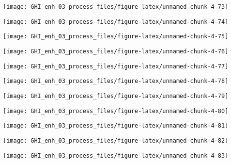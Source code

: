 \documentclass[
  10pt,
  a4paper,oneside]{article}
\begin{document}
\begin{center}\texttt{[image: GHI\_enh\_03\_process\_files/figure-latex/unnamed-chunk-4-73]} \end{center}

\begin{center}\texttt{[image: GHI\_enh\_03\_process\_files/figure-latex/unnamed-chunk-4-74]} \end{center}

\begin{center}\texttt{[image: GHI\_enh\_03\_process\_files/figure-latex/unnamed-chunk-4-75]} \end{center}

\begin{center}\texttt{[image: GHI\_enh\_03\_process\_files/figure-latex/unnamed-chunk-4-76]} \end{center}

\begin{center}\texttt{[image: GHI\_enh\_03\_process\_files/figure-latex/unnamed-chunk-4-77]} \end{center}

\begin{center}\texttt{[image: GHI\_enh\_03\_process\_files/figure-latex/unnamed-chunk-4-78]} \end{center}

\begin{center}\texttt{[image: GHI\_enh\_03\_process\_files/figure-latex/unnamed-chunk-4-79]} \end{center}

\begin{center}\texttt{[image: GHI\_enh\_03\_process\_files/figure-latex/unnamed-chunk-4-80]} \end{center}

\begin{center}\texttt{[image: GHI\_enh\_03\_process\_files/figure-latex/unnamed-chunk-4-81]} \end{center}

\begin{center}\texttt{[image: GHI\_enh\_03\_process\_files/figure-latex/unnamed-chunk-4-82]} \end{center}

\begin{center}\texttt{[image: GHI\_enh\_03\_process\_files/figure-latex/unnamed-chunk-4-83]} \end{center}
\end{document}
